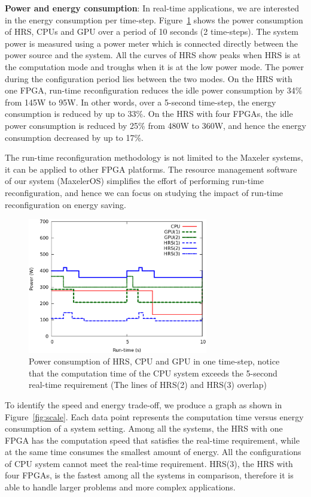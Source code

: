 \textbf{Power and energy consumption}: In real-time applications, we are interested in the energy consumption per time-step.
Figure~\ref{fig:power} shows the power consumption of HRS, CPUs and GPU over a period of 10 seconds (2 time-steps).
The system power is measured using a power meter which is connected directly between the power source and the system.
All the curves of HRS show peaks when HRS is at the computation mode and troughs when it is at the low power mode.
The power during the configuration period lies between the two modes.
On the HRS with one FPGA, run-time reconfiguration reduces the idle power consumption by 34\% from 145W to 95W.
In other words, over a 5-second time-step, the energy consumption is reduced by up to 33\%.
On the HRS with four FPGAs, the idle power consumption is reduced by 25\% from 480W to 360W, and hence the energy consumption decreased by up to 17\%.

The run-time reconfiguration methodology is not limited to the Maxeler systems, it can be applied to other FPGA platforms.
The resource management software of our system (MaxelerOS) simplifies the effort of performing run-time reconfiguration, and hence we can focus on studying the impact of run-time reconfiguration on energy saving.

\begin{figure}[t!]
\centering
\includegraphics[width=0.7\textwidth]{runtime_reconfiguration/figures/fig_power2}
\caption{Power consumption of HRS, CPU and GPU in one time-step, notice that the computation time of the CPU system exceeds the 5-second real-time requirement (The lines of HRS(2) and HRS(3) overlap)}
\label{fig:power}
\end{figure}

To identify the speed and energy trade-off, we produce a graph as shown in Figure~\ref{fig:scale}. 
Each data point represents the computation time versus energy consumption of a system setting.
Among all the systems, the HRS with one FPGA has the computation speed that satisfies the real-time requirement, while at the same time consumes the smallest amount of energy.
All the configurations of CPU system cannot meet the real-time requirement.
HRS(3), the HRS with four FPGAs, is the fastest among all the systems in comparison, therefore it is able to handle larger problems and more complex applications.

